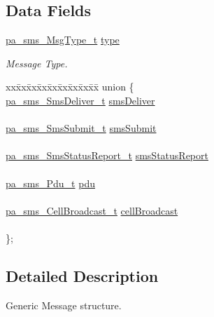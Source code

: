 \subsection*{Data Fields}
\begin{DoxyCompactItemize}
\item 
\hyperlink{pa__sms_8h_a0914a185712b38afe2909d72498adb57}{pa\+\_\+sms\+\_\+\+Msg\+Type\+\_\+t} \hyperlink{structpa__sms___message__t_a33f4502e2b2b5a872da6bd4e0f17c1dd}{type}
\begin{DoxyCompactList}\small\item\em Message Type. \end{DoxyCompactList}\item 
\begin{tabbing}
xx\=xx\=xx\=xx\=xx\=xx\=xx\=xx\=xx\=\kill
union \{\\
\>\hyperlink{structpa__sms___sms_deliver__t}{pa\_sms\_SmsDeliver\_t} \hyperlink{structpa__sms___message__t_aaa5ecf217cd15b629c75320006f4c55a}{smsDeliver}\\
\>\\
\>\hyperlink{structpa__sms___sms_submit__t}{pa\_sms\_SmsSubmit\_t} \hyperlink{structpa__sms___message__t_a9455a4ebbdd927391183df5f74822e65}{smsSubmit}\\
\>\\
\>\hyperlink{structpa__sms___sms_status_report__t}{pa\_sms\_SmsStatusReport\_t} \hyperlink{structpa__sms___message__t_a7276a47a147f6eb593cc82e04cc3eb0c}{smsStatusReport}\\
\>\\
\>\hyperlink{structpa__sms___pdu__t}{pa\_sms\_Pdu\_t} \hyperlink{structpa__sms___message__t_a8e7f4d7548bf7b7654e829d250b2c27f}{pdu}\\
\>\\
\>\hyperlink{structpa__sms___cell_broadcast__t}{pa\_sms\_CellBroadcast\_t} \hyperlink{structpa__sms___message__t_a6656080bbc251416607129c17afa93e0}{cellBroadcast}\\
\>\\
\}; \\

\end{tabbing}\end{DoxyCompactItemize}


\subsection{Detailed Description}
Generic Message structure. 


